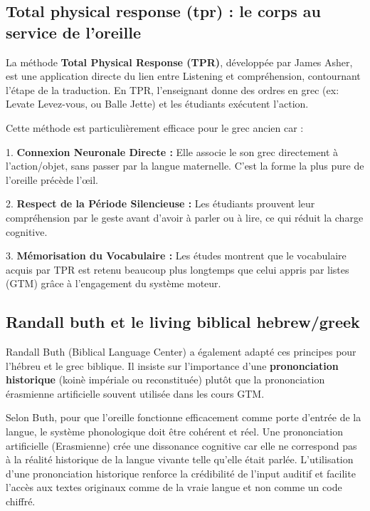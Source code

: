 \subsection{Total physical response (tpr) : le corps au service de l'oreille}

La méthode \textbf{Total Physical Response (TPR)}, développée par James Asher, est une application
directe du lien entre Listening et compréhension, contournant l'étape de la
traduction.\cite{III-2-1-ref53} En TPR, l'enseignant donne des ordres en grec (ex: \og Levate\!\fg{}
\- Levez-vous, ou \og Balle\!\fg{} \- Jette\!) et les étudiants exécutent l'action.

Cette méthode est particulièrement efficace pour le grec ancien car :

1. \textbf{Connexion Neuronale Directe :} Elle associe le son grec directement à l'action/objet,
sans passer par la langue maternelle. C'est la forme la plus pure de \og l'oreille précède
l'œil\fg{}.\cite{III-2-1-ref54}

2. \textbf{Respect de la Période Silencieuse :} Les étudiants prouvent leur compréhension par le
geste avant d'avoir à parler ou à lire, ce qui réduit la charge cognitive.\cite{III-2-1-ref55}

3. \textbf{Mémorisation du Vocabulaire :} Les études montrent que le vocabulaire acquis par TPR est
retenu beaucoup plus longtemps que celui appris par listes (GTM) grâce à l'engagement du système
moteur.\cite{III-2-1-ref57}



\subsection{Randall buth et le living biblical hebrew/greek}

Randall Buth (Biblical Language Center) a également adapté ces principes pour l'hébreu et le grec
biblique. Il insiste sur l'importance d'une \textbf{prononciation historique} (koinè impériale ou
reconstituée) plutôt que la prononciation érasmienne artificielle souvent utilisée dans les cours
GTM.\cite{III-2-1-ref58}

Selon Buth, pour que l'oreille fonctionne efficacement comme porte d'entrée de la langue, le système
phonologique doit être cohérent et \og réel\fg{}. Une prononciation artificielle (Erasmienne) crée
une dissonance cognitive car elle ne correspond pas à la réalité historique de la langue vivante
telle qu'elle était parlée. L'utilisation d'une prononciation historique renforce la crédibilité de
l'input auditif et facilite l'accès aux textes originaux comme \og de la vraie langue\fg{} et non
comme un code chiffré.\cite{III-2-1-ref60}




